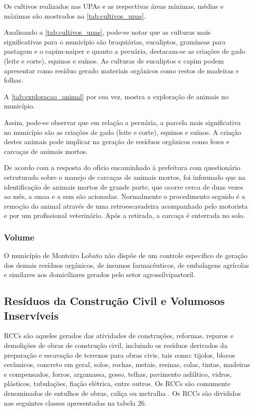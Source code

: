	Os cultivos realizados nas UPAs e as respectivas áreas mínimas, médias e máximas são mostrados na \autoref{tab:cultivos_upas}.
	
	
	
	Analisando a \autoref{tab:cultivos_upas}, pode-se notar que as culturas mais significativas para o município são braquiárias, eucaliptos, gramíneas para pastagem e o capim-naiper e quanto a pecuária, destacam-se as criações de gado (leite e corte), equinos e suínos. As culturas de eucaliptos e capim podem apresentar como resíduo gerado materiais orgânicos como restos de madeiras e folhas.
	
	A \autoref{tab:exploracao_animal} por sua vez, mostra a exploração de animais no município.
	
	
	
	Assim, pode-se observar que em relação a pecuária, a parcela mais significativa no município são as criações de gado (leite e corte), equinos e suínos. A criação destes animais pode implicar na geração de resíduos orgânicos como fezes e carcaças de animais mortos.
	
	De acordo com a resposta do ofício encaminhado à prefeitura com questionário estruturado sobre o manejo de carcaças de animais mortos, foi informado que na identificação de animais mortos de grande porte, que ocorre cerca de duas vezes ao mês, a \gls{smaa} e a \gls{ssm} são acionadas. Normalmente o procedimento seguido é a remoção do animal através de uma retroescavadeira acompanhado pelo motorista e por um profissional veterinário. Após a retirada, a carcaça é enterrada no solo.
	
	\subsubsection{Volume}
	O município de Monteiro Lobato não dispõe de um controle específico de geração dos demais resíduos orgânicos, de insumos farmacêuticos, de embalagens agrícolas e similares aos domiciliares gerados pelo setor agrossilvipastoril.
	
	\subsection{Resíduos da Construção Civil e Volumosos Inservíveis}
	RCCs são aqueles gerados das atividades de construções, reformas, reparos e demolições de obras de construção civil, incluindo os resíduos derivados da preparação e escavação de terrenos para obras civis, tais como: tijolos, blocos cerâmicos, concreto em geral, solos, rochas, metais, resinas, colas, tintas, madeiras e compensados, forros, argamassa, gesso, telhas, pavimento asfáltico, vidros, plásticos, tubulações, fiação elétrica, entre outros. Os RCCs são comumente denominados de entulhos de obras, caliça ou metralha \cite{brasil:12305, conama:307}. Os RCCs são divididos nas seguintes classes apresentadas na tabela 26.
	
